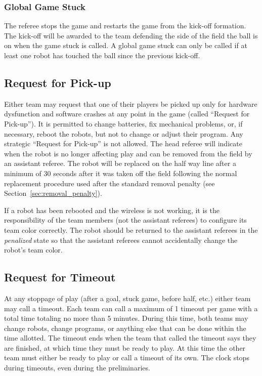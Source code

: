 \documentclass[12pt]{article}
\begin{document}
\subsubsection{Global Game Stuck}

The referee stops the game and restarts the game from the kick-off formation. The kick-off will be awarded to the team defending the side of the field the ball is on when the game stuck is called. A global game stuck can only be called if at least one robot has touched the ball since the previous kick-off.

\subsection{Request for Pick-up}

Either team may request that one of their players be picked up only for hardware dysfunction and software crashes at any point in the game (called ``Request for Pick-up''). It is permitted to change batteries, fix mechanical problems, or, if necessary, reboot the robots, but not to change or adjust their program. Any strategic ``Request for Pick-up'' is not allowed. The head referee will indicate when the robot is no longer affecting play and can be removed from the field by an assistant referee. The robot will be replaced on the half way line after a minimum of 30 seconds after it was taken off the field following the normal replacement procedure used after the standard removal penalty (see Section~\ref{sec:removal_penalty}).

If a robot has been rebooted and the wireless is not working, it is the responsibility of the team members (not the assistant referees) to configure its team color correctly. The robot should be returned to the assistant referees in the \emph{penalized} state so that the assistant referees cannot accidentally change the robot's team color.

\subsection{Request for Timeout}

At any stoppage of play (after a goal, stuck game, before half, etc.) either team may call a timeout. Each team can call a maximum of 1 timeout per game with a total time totaling no more than 5 minutes. During this time, both teams may change robots, change programs, or anything else that can be done within the time allotted. The timeout ends when the team that called the timeout says they are finished, at which time they must be ready to play. At this time the other team must either be ready to play or call a timeout of its own. The clock stops during timeouts, even during the preliminaries.
\end{document}
